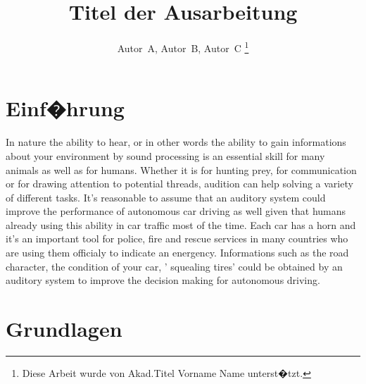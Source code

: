 \documentclass[journal,final,a4paper,twoside]{PS}
\begin{document}
\newcommand{\euertitel}{Titel der Ausarbeitung}   %
\newcommand{\betreuer}{Akad.Titel Vorname Name }  %

\headsep 40pt
\title{\euertitel}
\author{Autor~A,
        Autor~B,
        Autor~C
\thanks{Diese Arbeit wurde von \betreuer unterst�tzt.}}

\maketitle


\begin{Zusammenfassung}

\end{Zusammenfassung}
\vspace{6pt}

\begin{abstract}

\end{abstract}

\section{Einf�hrung}

In nature the ability to hear, or in other words the ability to gain informations about your environment by sound processing is an essential skill for many animals as well as for humans. Whether it is for hunting prey, for communication or for drawing attention to potential threads, audition can help solving a variety of different tasks. It's reasonable to assume that an auditory system could improve the performance of autonomous car driving as well given that humans already using this ability in car traffic most of the time. Each car has a horn and it's an important tool for police, fire and rescue services in many countries who are using them officialy to indicate an energency. Informations such as the road character, the condition of your car, ' squealing tires'  could be obtained by an auditory system to improve the decision making for autonomous driving. 

\section{Grundlagen}
\label{sec:grundlangen}
\end{document}
